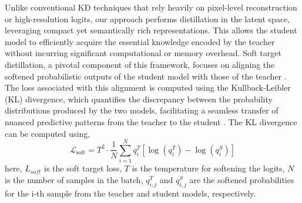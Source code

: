 \documentclass[a4paper,fleqn]{ieeetj}
\begin{document}
Unlike conventional KD techniques that rely heavily on pixel-level reconstruction or high-resolution logits, our approach performs distillation in the latent space, leveraging compact yet semantically rich representations. This allows the student model to efficiently acquire the essential knowledge encoded by the teacher without incurring significant computational or memory overhead. Soft target distillation, a pivotal component of this framework, focuses on aligning the softened probabilistic outputs of the student model with those of the teacher \cite{li2022soft}. The loss associated with this alignment is computed using the Kullback-Leibler (KL) divergence, which quantifies the discrepancy between the probability distributions produced by the two models, facilitating a seamless transfer of nuanced predictive patterns from the teacher to the student \cite{hwang2023comparison}. The KL divergence can be computed using,
\begin{equation}
    \mathcal{L}_{\text{soft}} = T^2 \cdot \frac{1}{N} \sum_{i=1}^{N} q_{i}^T \left[ \log(q_{i}^T) - \log(q_{i}^S) \right]
\end{equation}
here, $L_{soft}$ is the soft target loss, $T$ is the temperature for softening the logits, $N$ is the number of samples in the batch, $q_{i,j}^T$ and $q_{i,j}^S$ are the softened probabilities for the 
i-th sample from the teacher and student models, respectively.
\end{document}
